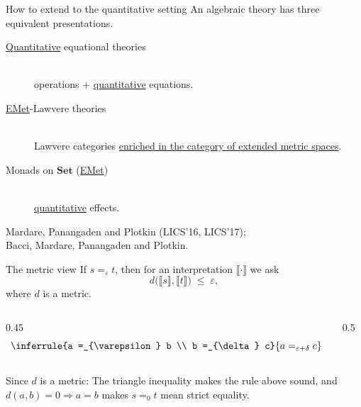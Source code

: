\documentclass[10pt,aspectratio=169]{beamer}
\newcommand{\qeq}[1]{=_{#1}}
\newcommand{\den}[1]{\llbracket #1 \rrbracket}
\newcommand{\eps}{\varepsilon}
\begin{document}
\begin{frame}{How to extend to the quantitative setting}
    An algebraic theory has three equivalent presentations.
    \vfill
    \begin{description}
        \item[\underline{Quantitative} equational theories]\hfill\\
            operations $+$ \underline{quantitative} equations.
            \medskip
        \item[\underline{EMet}-Lawvere theories]\hfill\\
            Lawvere categories \underline{enriched in the category of extended
            metric spaces}.
            \medskip
        \item[Monads on $\mathbf{Set}$ (\underline{EMet})]\hfill\\
            \underline{quantitative} effects.
    \end{description}
    \vfill
    \hfill{\small Mardare, Panangaden and Plotkin (LICS'16, LICS'17);}\\
    \hfill{\small Bacci, Mardare, Panangaden and Plotkin.}
\end{frame}

\begin{frame}{The metric view}
    If $s \qeq{\eps} t$, then for an interpretation
    $\den{\cdot} $ we ask
    \[ d\bigl(\den{s},\den{t}\bigr) \;\leq\; \eps , \]
    where $d$ is a metric.
    \vfill
    \pause
    \begin{columns}[c]
        \begin{column}{0.45\textwidth}
            \[
                \inferrule{a \qeq{\eps} b \\ b \qeq{\delta} c}
                {a \qeq{\eps + \delta} c}
            \]
        \end{column}
        \begin{column}{0.5\textwidth}
            \centering
        \end{column}
    \end{columns}
    \vfill
    Since $d$ is a metric: The triangle inequality makes the rule
    above sound, and $d(a,b) = 0 \Rightarrow a = b$ makes $s \qeq{0} t$
    mean strict equality.
\end{frame}
\end{document}
